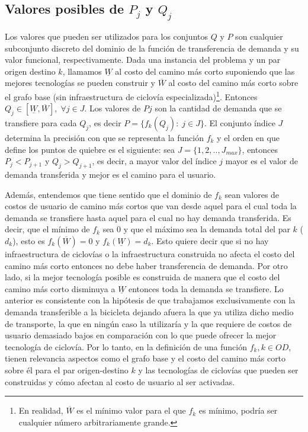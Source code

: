 \subsection{Valores posibles de $P_j$ y $Q_j$}

Los valores que pueden ser utilizados para los conjuntos $Q$ y $P$ son cualquier subconjunto discreto del dominio de la función de transferencia de demanda y su valor funcional, respectivamente. Dada una instancia del problema y un par origen destino $k$, llamamos $\underline{W}$ al costo del camino más corto suponiendo que las mejores tecnologías se pueden construir y $\overline{W}$ al costo del camino más corto sobre el grafo base (sin infraestructura de ciclovía especializada)\footnote{En realidad, $\overline{W}$ es el mínimo valor para el que $f_k$ es mínimo, podría ser cualquier número arbitrariamente grande.}. Entonces $Q_j \in [\underline{W}, \overline{W}],\; \forall j \in J$. Los valores de $Pj$ son la cantidad de demanda que se transfiere para cada $Q_j$, es decir $P = \{f_k(Q_j):\; j \in J\}$. El conjunto índice $J$ determina la precisión con que se representa la función $f_k$ y el orden en que define los puntos de quiebre es el siguiente: sea $J = \{1, 2, .. , J_{max}\}$, entonces $P_j < P_{j+1}$ y $Q_j > Q_{j+1}$, es decir, a mayor valor del índice $j$ mayor es el valor de demanda transferida y mejor es el camino para el usuario.

Además, entendemos que tiene sentido que el dominio de $f_k$ sean valores de costos de usuario de camino más cortos que van desde aquel para el cual toda la demanda se transfiere hasta aquel para el cual no hay demanda transferida. Es decir, que el mínimo de $f_k$ sea 0 y que el máximo sea la demanda total del par $k$ ($d_k$), esto es $f_k(\overline{W}) = 0$ y $f_k(\underline{W}) = d_k$. Esto quiere decir que si no hay infraestructura de ciclovías o la infraestructura construida no afecta el costo del camino más corto entonces no debe haber transferencia de demanda. Por otro lado, si la mejor tecnología posible es construida de manera que el costo del camino más corto disminuya a $\underline{W}$ entonces toda la demanda se transfiere. Lo anterior es consistente con la hipótesis de que trabajamos exclusivamente con la demanda transferible a la bicicleta dejando afuera la que ya utiliza dicho medio de transporte, la que en ningún caso la utilizaría y la que requiere de costos de usuario demasiado bajos en comparación con lo que puede ofrecer la mejor tecnología de ciclovía. Por lo tanto, en la definición de una función $f_k, k \in OD$, tienen relevancia aspectos como el grafo base y el costo del camino más corto sobre él para el par origen-destino $k$ y las tecnologías de ciclovías que pueden ser construidas y cómo afectan al costo de usuario al ser activadas.

